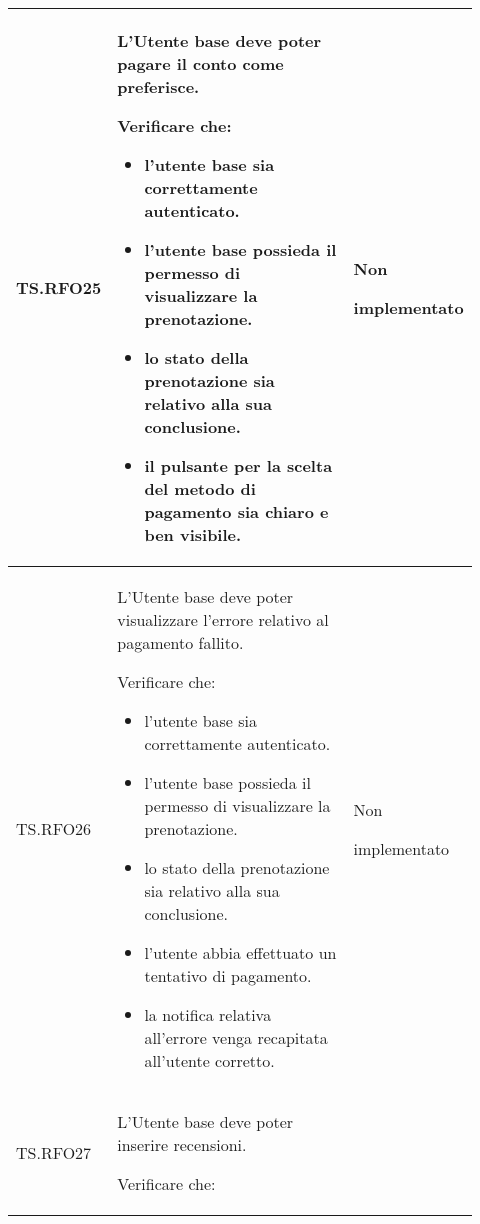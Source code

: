 \begin{longtable}{|p{0.10\linewidth}|p{0.70\linewidth}|p{0.12\linewidth}|}
	\hline
	TS.RFO25                                                                                                                        &
	L’Utente base deve poter pagare il conto come preferisce.   \par
	Verificare che:
	\begin{itemize}
		\item l'utente base sia correttamente autenticato.
		\item l'utente base possieda il permesso di visualizzare la prenotazione.
		\item lo stato della prenotazione sia relativo alla sua conclusione.
		\item il pulsante per la scelta del metodo di pagamento sia chiaro e ben visibile.
	\end{itemize}                                              &
	Non \par implementato                                                                                                                                                   \\
	\hline
	TS.RFO26                                                                                                                        &
	L’Utente base deve poter visualizzare l’errore relativo al pagamento fallito.   \par
	Verificare che:
	\begin{itemize}
		\item l'utente base sia correttamente autenticato.
		\item l'utente base possieda il permesso di visualizzare la prenotazione.
		\item lo stato della prenotazione sia relativo alla sua conclusione.
		\item l'utente abbia effettuato un tentativo di pagamento.
		\item la notifica relativa all'errore venga recapitata all'utente corretto.
	\end{itemize}                                                     &
	Non \par implementato                                                                                                                                                   \\
	\hline
	TS.RFO27                                                                                                                        &
	L’Utente base deve poter inserire recensioni.   \par
	Verificare che:

\end{longtable}
